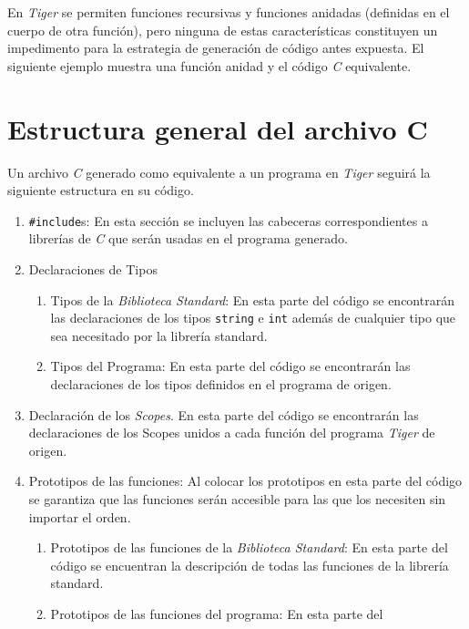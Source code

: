 \documentclass{article}
\begin{document}
En \textit{Tiger} se permiten funciones recursivas y funciones anidadas
(definidas en el cuerpo de otra función), pero ninguna de estas características
constituyen un impedimento para la estrategia de generación de código antes
expuesta. El siguiente ejemplo muestra una función anidad y el código
\textit{C} equivalente. 


\section{Estructura general del archivo C}

Un archivo \textit{C} generado como equivalente a un programa en \textit{Tiger}
seguirá la siguiente estructura en su código.

\begin{enumerate}
    \item \texttt{\#include}s: En esta sección se incluyen las cabeceras
    correspondientes a librerías de \textit{C} que serán usadas en el programa
    generado.
    \item Declaraciones de Tipos
        \begin{enumerate}
            \item Tipos de la  \textit{Biblioteca Standard}: En esta parte del
            código se encontrarán las declaraciones de los tipos
            \texttt{string} e \texttt{int} además de cualquier tipo que sea
            necesitado por la librería standard.
      		\item Tipos del Programa: En esta parte del código se encontrarán
      		las declaraciones de los tipos definidos en el programa de origen.
  		\end{enumerate}
  	\item Declaración de los \textit{Scopes}. En esta parte del código se
  	encontrarán las declaraciones de los Scopes unidos a cada función del
  	programa \textit{Tiger} de origen.
  	\item Prototipos de las funciones: Al colocar los prototipos en esta parte
  	del código se garantiza que las funciones serán accesible para las que los
  	necesiten sin importar el orden.
        \begin{enumerate}
            \item Prototipos de las funciones de la \textit{Biblioteca
            Standard}: En esta parte del código se encuentran la descripción de
            todas las funciones de la librería standard.
            \item Prototipos de las funciones del programa: En esta parte del

\end{enumerate}
\end{enumerate}
\end{document}
